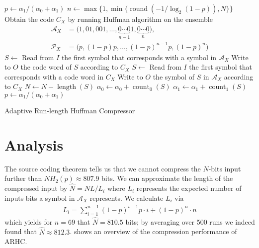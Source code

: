 \documentclass[letterpaper,11pt]{extarticle}
\begin{document}
\begin{algorithm}[ht]
    \begin{algorithmic}[1]
         
                \State $p \gets \alpha_1 / (\alpha_0 + \alpha_1)$
            \EndIf
                \State $n \gets \max\{1,\min\{\operatorname{round}(-1/\log_2 (1 - p)) , N\}\}$
                \State Obtain the code $C_X$ by running Huffman algorithm on the ensemble \begin{align*}
                    \mathcal{A}_X &= \big(1, 01, 001, \ldots, \underbrace{0\cdots0}_{n-1}\!1, \underbrace{0\cdots0}_{n} \big), \\
                    \mathcal{P}_X &= \big( p, (1-p)p, \ldots, (1-p)^{n-1}p, (1-p)^n \big)
                \end{align*}
                    \State $S \gets$ Read from $I$ the first symbol that corresponds with a symbol in $\mathcal{A}_X$
                    \State Write to $O$ the code word of $S$ according to $C_X$
                    \State $S \gets$ Read from $I$ the first symbol that corresponds with a code word in $C_X$
                    \State Write to $O$ the symbol of $S$ in $\mathcal{A}_X$ according to $C_X$
                \EndIf
                \State $N \gets N - \operatorname{length}(S)$
                    \State $\alpha_0 \gets \alpha_0 + \operatorname{count}_0(S)$
                    \State $\alpha_1 \gets \alpha_1 + \operatorname{count}_1(S)$
                    \State $p \gets \alpha_1 / (\alpha_0 + \alpha_1)$
                \EndIf
            \EndWhile
        \EndFunction
    \end{algorithmic}
    \caption{Adaptive Run-length Huffman Compressor}
    \label{alg:pseudo}
\end{algorithm}

\section{Analysis}
\label{sec:analysis}
The source coding theorem tells us that we cannot compress the $N$-bits input further than $NH_2(p)\approx807.9$ bits. We can approximate the length of the compressed input by $\hat{N}=NL/L_i$ where $L_i$ represents the expected number of inputs bits a symbol in $\mathcal{A}_X$ represents. We calculate $L_i$ via
\begin{align*}
    L_i = \sum_{i=1}^{n-1}(1-p)^{i-1}p\cdot i +(1-p)^n\cdot n
\end{align*}
which yields for $n=69$ that $\hat{N}=810.5$ bits; by averaging over 500 runs we indeed found that $\hat{N}\approx 812.3$.  shows an overview of the compression performance of ARHC.
\end{document}
